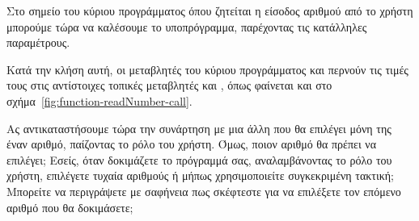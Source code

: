 \documentclass[a4paper,11pt,oneside]{book}
\begin{document}
Στο σημείο του κύριου προγράμματος όπου ζητείται η είσοδος αριθμού από το χρήστη μπορούμε τώρα να καλέσουμε το υποπρόγραμμα, παρέχοντας τις κατάλληλες παραμέτρους.


Κατά την κλήση αυτή, οι μεταβλητές του κύριου προγράμματος  και  περνούν τις τιμές τους στις αντίστοιχες τοπικές μεταβλητές  και , όπως φαίνεται και στο σχήμα~\ref{fig:function-readNumber-call}. 


Ας αντικαταστήσουμε τώρα την συνάρτηση  με μια άλλη που θα επιλέγει μόνη της έναν αριθμό, παίζοντας το ρόλο του χρήστη. Όμως, ποιον αριθμό θα πρέπει να επιλέγει;
Εσείς, όταν δοκιμάζετε το πρόγραμμά σας, αναλαμβάνοντας το ρόλο του χρήστη, επιλέγετε τυχαία αριθμούς ή μήπως χρησιμοποιείτε συγκεκριμένη τακτική; %
Μπορείτε να περιγράψετε με σαφήνεια πως σκέφτεστε για να επιλέξετε τον επόμενο αριθμό που θα δοκιμάσετε; 
\end{document}
